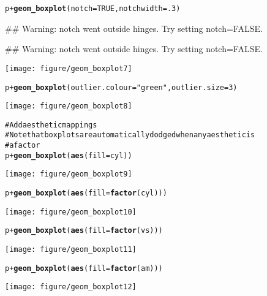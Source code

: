 \documentclass[a4paper,titlepage]{tufte-handout}\usepackage{graphicx, color}
\makeatletter
\def\maxwidth{ %
  \ifdim\Gin@nat@width>\linewidth
    \linewidth
  \else
    \Gin@nat@width
  \fi
}
\newcommand{\hlfunctioncall}[1]{\textcolor[rgb]{0.501960784313725,0,0.329411764705882}{\textbf{#1}}}%
\newcommand{\hlstring}[1]{\textcolor[rgb]{0.6,0.6,1}{#1}}%
\newcommand{\hlcomment}[1]{\textcolor[rgb]{0.180392156862745,0.6,0.341176470588235}{#1}}%
\newenvironment{kframe}{%
 \def\at@end@of@kframe{}%
 \ifinner\ifhmode%
  \def\at@end@of@kframe{\end{minipage}}%
  \begin{minipage}{\columnwidth}%
 \fi\fi%
 \def\FrameCommand##1{\hskip\@totalleftmargin \hskip-\fboxsep
 \colorbox{shadecolor}{##1}\hskip-\fboxsep
     \hskip-\linewidth \hskip-\@totalleftmargin \hskip\columnwidth}%
 \MakeFramed {\advance\hsize-\width
   \@totalleftmargin\z@ \linewidth\hsize
   \@setminipage}}%
 {\par\unskip\endMakeFramed%
 \at@end@of@kframe}
\newenvironment{knitrout}{}{} %
\makeatother
\begin{document}
\begin{knitrout}
\begin{kframe}
\begin{alltt}
p + \hlfunctioncall{geom_boxplot}(notch = TRUE, notchwidth = .3)
\end{alltt}
\begin{flushleft}\ttfamily\noindent\textcolor{warningcolor}{\#\# Warning: notch went outside hinges. Try setting notch=FALSE.}\end{flushleft}\begin{flushleft}\ttfamily\noindent\textcolor{warningcolor}{\#\# Warning: notch went outside hinges. Try setting notch=FALSE.}\end{flushleft}\end{kframe}\texttt{[image: figure/geom\_boxplot7]} \begin{kframe}\begin{alltt}
p + \hlfunctioncall{geom_boxplot}(outlier.colour = \hlstring{"green"}, outlier.size = 3)
\end{alltt}
\end{kframe}\texttt{[image: figure/geom\_boxplot8]} \begin{kframe}\begin{alltt}
\hlcomment{# Add aesthetic mappings}
\hlcomment{# Note that boxplots are automatically dodged when any aesthetic is}
\hlcomment{# a factor}
p + \hlfunctioncall{geom_boxplot}(\hlfunctioncall{aes}(fill = cyl))
\end{alltt}
\end{kframe}\texttt{[image: figure/geom\_boxplot9]} \begin{kframe}\begin{alltt}
p + \hlfunctioncall{geom_boxplot}(\hlfunctioncall{aes}(fill = \hlfunctioncall{factor}(cyl)))
\end{alltt}
\end{kframe}\texttt{[image: figure/geom\_boxplot10]} \begin{kframe}\begin{alltt}
p + \hlfunctioncall{geom_boxplot}(\hlfunctioncall{aes}(fill = \hlfunctioncall{factor}(vs)))
\end{alltt}
\end{kframe}\texttt{[image: figure/geom\_boxplot11]} \begin{kframe}\begin{alltt}
p + \hlfunctioncall{geom_boxplot}(\hlfunctioncall{aes}(fill = \hlfunctioncall{factor}(am)))
\end{alltt}
\end{kframe}\texttt{[image: figure/geom\_boxplot12]} \begin{kframe}\begin{alltt}

\end{alltt}
\end{kframe}
\end{knitrout}
\end{document}
